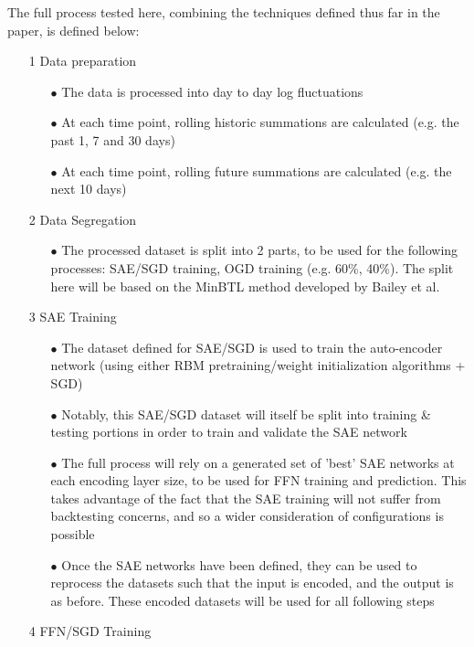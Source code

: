 \documentclass[a4paper,latin]{paper}
\begin{document}
The full process tested here, combining the techniques defined thus far in the paper, is defined  below:

\begin{itemize}
	\item [1] Data preparation
	\begin{itemize}
		\item[$\bullet$] The data is processed into day to day log fluctuations
		\item[$\bullet$] At each time point, rolling historic summations are calculated (e.g. the past 1, 7 and 30 days) 
		\item[$\bullet$] At each time point, rolling future summations are calculated (e.g. the next 10 days) 
	\end{itemize}
	\item [2] Data Segregation
	\begin{itemize}
		\item[$\bullet$] The processed dataset is split into 2 parts, to be used for the following processes: SAE/SGD training, OGD training (e.g. 60\%, 40\%). The split here will be based on the MinBTL method developed by Bailey et al. 
	\end{itemize}	
	\item [3] SAE Training
	\begin{itemize}
		\item[$\bullet$] The dataset defined for SAE/SGD is used to train the auto-encoder network (using either RBM pretraining/weight initialization algorithms + SGD)
		\item[$\bullet$] Notably, this SAE/SGD dataset will itself be split into training \& testing portions in order to train and validate the SAE network
		\item[$\bullet$] The full process will rely on a generated set of 'best' SAE networks at each encoding layer size, to be used for FFN training and prediction. This takes advantage of the fact that the SAE training will not suffer from backtesting concerns, and so a wider consideration of configurations is possible
		\item[$\bullet$] Once the SAE networks have been defined, they can be used to reprocess the datasets such that the input is encoded, and the output is as before. These encoded datasets will be used for all following steps
	\end{itemize}		
	\item [4] FFN/SGD Training

\end{itemize}
\end{document}
